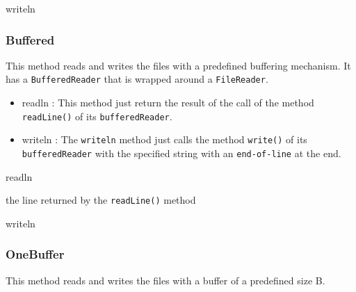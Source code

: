 \documentclass[12pt]{article}
\begin{document}
\begin{algorithm}[H]
\caption{writeln}
\label{algo:2}
\begin{algorithmic}[1]
\ENDFOR
{}
\end{algorithmic}
\end{algorithm}

\subsubsection{Buffered}
This method reads and writes the files with a predefined buffering mechanism. It has a \texttt{BufferedReader} that is wrapped around a \texttt{FileReader}.

\begin{itemize}
    \item readln : This method just return the result of the call of the method \texttt{readLine()} of its \texttt{bufferedReader}.
    
    \item writeln : The \texttt{writeln} method just calls the method \texttt{write()} of its \texttt{bufferedReader} with the specified string with an \texttt{end-of-line} at the end.
\end{itemize}

\begin{algorithm}[H]
\caption{readln}
\label{algo:3}
\begin{algorithmic}[1]
\RETURN the line returned by the \texttt{readLine()} method
\end{algorithmic}
\end{algorithm}

\begin{algorithm}[H]
\caption{writeln}
\label{algo:4}
\begin{algorithmic}[1]
\end{algorithmic}
\end{algorithm}

\subsubsection{OneBuffer}
This method reads and writes the files with a buffer of a predefined size B.
\end{document}
